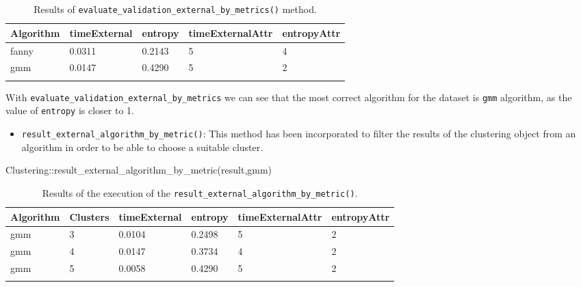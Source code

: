 \documentclass[
]{article}
\newenvironment{Shaded}{\begin{snugshade}}{\end{snugshade}}
\newcommand{\FunctionTok}[1]{\textcolor[rgb]{0.00,0.00,0.00}{#1}}
\newcommand{\NormalTok}[1]{#1}
\newcommand{\SpecialCharTok}[1]{\textcolor[rgb]{0.00,0.00,0.00}{#1}}
\newcommand{\StringTok}[1]{\textcolor[rgb]{0.31,0.60,0.02}{#1}}
\providecommand{\tightlist}{%
  \setlength{\itemsep}{0pt}\setlength{\parskip}{0pt}}
\begin{document}
\begin{longtable}{| p{1.3cm} | p{1.6cm} | p{0.8cm} | p{2.2cm} | p{1.8cm} |}
\hline
\scriptsize Algorithm & \scriptsize timeExternal & \scriptsize entropy & \scriptsize timeExternalAttr & \scriptsize entropyAttr \\
\hline
\scriptsize   fanny   & \scriptsize    0.0311    & \scriptsize 0.2143  & \scriptsize        5         & \scriptsize     4 \\
\scriptsize    gmm    & \scriptsize    0.0147    & \scriptsize 0.4290  & \scriptsize        5         & \scriptsize     2  \\
\hline
\caption{Results of \texttt{evaluate\_validation\_external\_by\_metrics()} method.}
\label{tab:evaluatevalidationexternalbymetrics}
\end{longtable}

With \texttt{evaluate\_validation\_external\_by\_metrics} we can see
that the most correct algorithm for the dataset is \texttt{gmm}
algorithm, as the value of \texttt{entropy} is closer to 1.

\begin{itemize}
\tightlist
\item
  \texttt{result\_external\_algorithm\_by\_metric()}: This method has
  been incorporated to filter the results of the clustering object from
  an algorithm in order to be able to choose a suitable cluster.
\end{itemize}

\begin{Shaded}
\begin{Highlighting}[]
\NormalTok{Clustering}\SpecialCharTok{::}\FunctionTok{result\_external\_algorithm\_by\_metric}\NormalTok{(result,}\StringTok{\textquotesingle{}gmm\textquotesingle{}}\NormalTok{)}
\end{Highlighting}
\end{Shaded}

\begin{longtable}{| p{1.3cm} | p{1.5cm} | p{1.7cm} | p{1.2cm} | p{2.1cm} | p{1.8cm} |}
\hline
\scriptsize Algorithm & \scriptsize Clusters & \scriptsize timeExternal & \scriptsize entropy & \scriptsize timeExternalAttr & \scriptsize entropyAttr  \\
\hline
\scriptsize    gmm    & \scriptsize     3    & \scriptsize    0.0104    & \scriptsize 0.2498  & \scriptsize         5        & \scriptsize       2 \\
\scriptsize    gmm    & \scriptsize     4    & \scriptsize    0.0147    & \scriptsize 0.3734  & \scriptsize         4        & \scriptsize       2 \\
\scriptsize    gmm    & \scriptsize     5    & \scriptsize    0.0058    & \scriptsize  0.4290  & \scriptsize         5        & \scriptsize       2 \\
\hline
\caption{Results of the execution of the \texttt{result\_external\_algorithm\_by\_metric()}.}
\label{tab:resultexternalalgorithmbymetric}
\end{longtable}
\end{document}
